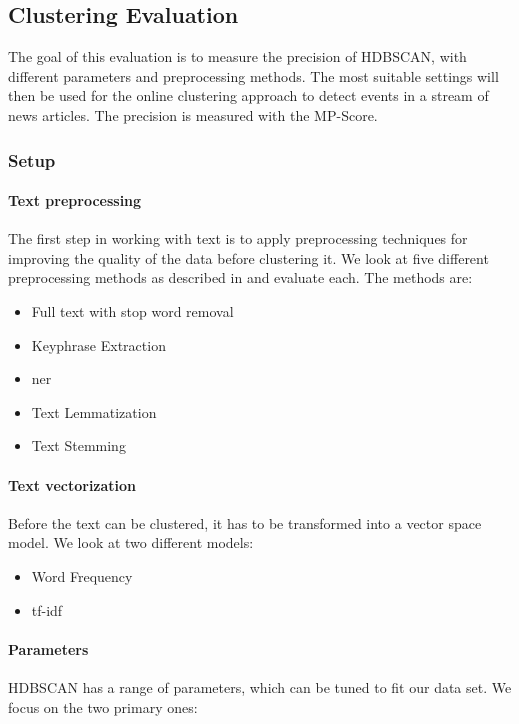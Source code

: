 \subsection{Clustering Evaluation}
\label{subsec:5a_clustering_evaluation}

The goal of this evaluation is to measure the precision of HDBSCAN, with different parameters and preprocessing methods.
The most suitable settings will then be used for the online clustering approach to detect events in a stream of news articles.
The precision is measured with the MP-Score.

\subsubsection{Setup}
\label{subsubsec:5a_setup}

\paragraph{Text preprocessing}
The first step in working with text is to apply preprocessing techniques
for improving the quality of the data before clustering it.
We look at five different preprocessing methods as described in 
and evaluate each.
The methods are:

\begin{itemize}
    \item Full text with stop word removal
    \item Keyphrase Extraction
    \item \Gls{ner}
    \item Text Lemmatization
    \item Text Stemming
\end{itemize}

\paragraph{Text vectorization}
Before the text can be clustered, it has to be transformed into a vector space model.
We look at two different models:

\begin{itemize}
    \item Word Frequency
    \item tf-idf
\end{itemize}

\paragraph{Parameters}
HDBSCAN has a range of parameters, which can be tuned to fit our data set.
We focus on the two primary ones:

